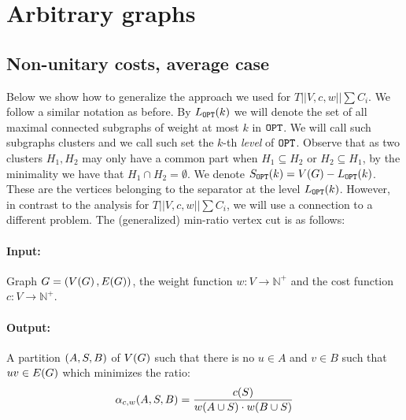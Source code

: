 \section{Arbitrary graphs}
\subsection{Non-unitary costs, average case}
Below we show how to generalize the approach we used for $T||V,c,w||\sum C_i$. We follow a similar notation as before. By $L_{\texttt{OPT}}\mathopen{}\left( k \right)$ we will denote the set of all maximal connected subgraphs of weight at most $k$ in $\texttt{OPT}$. We will call such subgraphs clusters and we call such set the $k$-th \textit{level} of $\texttt{OPT}$. Observe that as two clusters $H_1, H_2$ may only have a common part when $H_1\subseteq H_2$ or $H_2\subseteq H_1$, by the minimality we have that $H_1 \cap H_2 =\emptyset$. We denote $S_{\texttt{OPT}}\mathopen{}\left( k \right)=V\mathopen{}\left( G \right)-L_{\texttt{OPT}}\mathopen{}\left( k \right)$. These are the vertices belonging to the separator at the level $L_{\texttt{OPT}}\mathopen{}\left( k \right)$. 
However, in contrast to the analysis for $T||V,c,w||\sum C_i$, we will use a connection to a different problem. The (generalized) min-ratio vertex cut is as follows:

\begin{tcolorbox}[colback=white, title= Min-ratio vertex cut, fonttitle=\bfseries, breakable]
\paragraph{Input:} Graph $G=\mathopen{}\left( V\mathopen{}\left( G \right), E\mathopen{}\left( G \right) \right)$, the weight function $w:V\to \mathbb{N}^+$ and the cost function $c:V\to \mathbb{N}^+$.
\paragraph{Output:} A partition $\mathopen{}\left( A,S,B \right)$ of $V\mathopen{}\left( G \right)$ such that there is no $u\in A$ and $v\in B$ such that $uv\in E\mathopen{}\left( G \right)$ which minimizes the ratio:
$$
\alpha_{c,w}\mathopen{}\left( A,S,B \right)=\frac{c\mathopen{}\left( S \right)}{w\mathopen{}\left( A\cup S \right)\cdot w\mathopen{}\left( B\cup S \right)}
$$
\end{tcolorbox}

